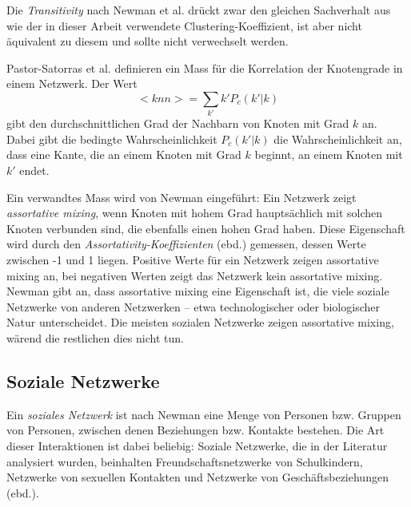 Die \emph{Transitivity} nach Newman et al. dr\"uckt zwar den gleichen
Sachverhalt aus wie der in dieser Arbeit verwendete
Clustering-Koeffizient, ist aber nicht \"aquivalent zu diesem und
sollte nicht verwechselt werden.

Pastor-Satorras et al. definieren ein Mass f\"ur die Korrelation der
Knotengrade in einem Netzwerk\cite{PhysRevLett.87.258701}. Der Wert
\begin{equation}
  \label{eq:9}
  <knn> = \sum_{k'} k'P_c (k'|k)
\end{equation}
gibt den durchschnittlichen Grad der Nachbarn von Knoten mit Grad $k$
an.  Dabei gibt die bedingte Wahrscheinlichkeit $P_c(k'|k)$ die
Wahrscheinlichkeit an, dass eine Kante, die an einem Knoten mit Grad
$k$ beginnt, an einem Knoten mit $k'$ endet.

Ein verwandtes Mass wird von Newman eingef\"uhrt: Ein Netzwerk zeigt
\emph{assortative mixing}, wenn Knoten mit hohem Grad haupts\"achlich
mit solchen Knoten verbunden sind, die ebenfalls einen hohen Grad
haben\cite{PhysRevLett.89.208701}. Diese Eigenschaft wird durch den
\emph{Assortativity-Koeffizienten} (ebd.)  gemessen, dessen Werte
zwischen -1 und 1 liegen. Positive Werte f\"ur ein Netzwerk zeigen
assortative mixing an, bei negativen Werten zeigt das Netzwerk kein
assortative mixing. Newman gibt an, dass assortative mixing eine
Eigenschaft ist, die viele soziale Netzwerke von anderen Netzwerken --
etwa technologischer oder biologischer Natur unterscheidet. Die
meisten sozialen Netzwerke zeigen assortative mixing, w\"arend die
restlichen dies nicht tun.

\subsection{Soziale Netzwerke}
\label{sec:soziale-netzwerke}

Ein \emph{soziales Netzwerk} ist nach Newman\cite{newman:167} eine
Menge von Personen bzw. Gruppen von Personen, zwischen denen
Beziehungen bzw. Kontakte bestehen. Die Art dieser Interaktionen ist
dabei beliebig: Soziale Netzwerke, die in der Literatur analysiert
wurden, beinhalten Freundschaftsnetzwerke von Schulkindern, Netzwerke
von sexuellen Kontakten und Netzwerke von Gesch\"aftsbeziehungen
(ebd.).

